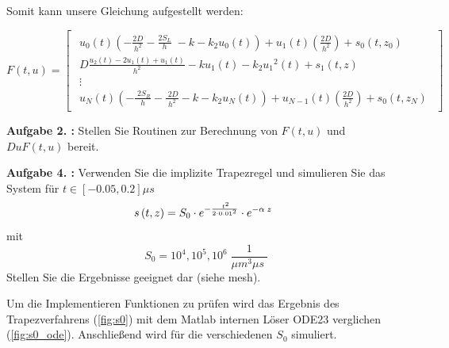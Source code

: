 Somit kann unsere Gleichung aufgestellt werden:

\begin{equation}
		F(t,u)= 
\begin{bmatrix}
	\begin{array}{c}
		u_0 \left(t\right)\left(-\frac{2D}{h^2 }-\frac{{2S}_L }{h}\;-k-k_2 u_0 \left(t\right)\right)+u_1 \left(t\right)\left(\frac{2D}{h^2 }\right)+s_0 \left(t,z_0 \right)\;\\
		D\frac{u_2 \left(t\right)-{2u}_1 \left(t\right)+u_1 \left(t\right)}{h^2 }-ku_1 \left(t\right)-k_2 {u_1 }^2 \left(t\right)+s_1 \left(t,z\right)\\
		\vdots \\
		u_N \left(t\right)\left(-\frac{\;2S_R }{h}-\frac{\;2D}{h^2 }-k-k_2 u_N \left(t\right)\right)+u_{N-1} \left(t\right)\left(\frac{2D}{h^2 }\right)+s_0 \left(t,z_N \right)
	\end{array}
\end{bmatrix}  
\end{equation}

\begin{mybox}
	\textbf{Aufgabe 2. :}	Stellen Sie Routinen zur Berechnung von $ F(t,u) $ und $ DuF(t,u) $ bereit.
\end{mybox}




\begin{mybox}
	\textbf{Aufgabe 4. :}	Verwenden Sie die implizite Trapezregel und simulieren Sie das System für $ t \in [-0.05,0.2]\mu s$ \begin{equation}s\left(t,z\right)=S_0 \cdot e^{-\frac{\;t^2 }{2\cdot 0\ldotp {01}^2 }} \cdot e^{-\alpha \;z} \;\;\end{equation} mit \begin{equation} S_0 ={10}^4 ,{10}^5 ,{10}^6 \;\frac{1}{\mu m^3 \mu s\;} \end{equation}
	Stellen Sie die Ergebnisse geeignet dar (siehe mesh).
\end{mybox}
Um die Implementieren Funktionen zu prüfen wird das Ergebnis des Trapezverfahrens (\cref{fig:s0}) mit dem Matlab internen Löser ODE23 verglichen (\cref{fig:s0_ode}).
Anschließend wird für die verschiedenen $S_0$ simuliert.


